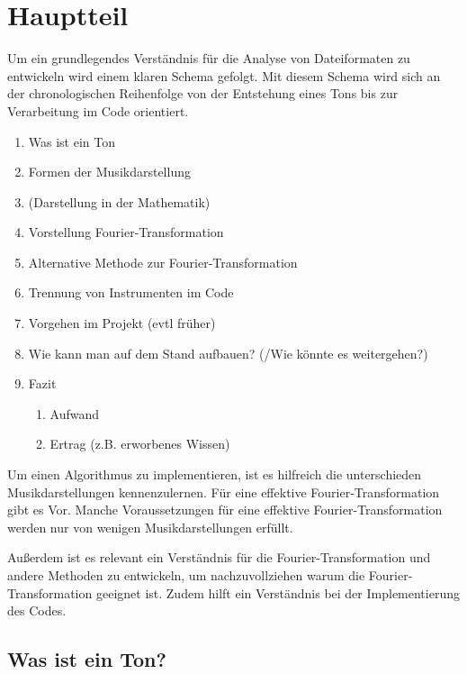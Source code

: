 \chapter{Hauptteil}
%


Um ein grundlegendes Verständnis für die Analyse von Dateiformaten zu entwickeln wird einem klaren Schema gefolgt. Mit diesem Schema wird sich an der chronologischen Reihenfolge von der Entstehung eines Tons bis zur Verarbeitung im Code orientiert.

%
\begin{enumerate}
    \item Was ist ein Ton
    \item Formen der Musikdarstellung
    \item (Darstellung in der Mathematik)
    \item Vorstellung Fourier-Transformation
    \item Alternative Methode zur Fourier-Transformation
    \item Trennung von Instrumenten im Code
    \item Vorgehen im Projekt (evtl früher)
    \item Wie kann man auf dem Stand aufbauen? (/Wie könnte es weitergehen?)
    \item Fazit
    \begin{enumerate}
        \item Aufwand
        \item Ertrag (z.B. erworbenes Wissen)
    \end{enumerate}
\end{enumerate}
%

Um einen Algorithmus zu implementieren, ist es hilfreich die unterschieden Musikdarstellungen kennenzulernen. Für eine effektive Fourier-Transformation gibt es Vor. Manche Voraussetzungen für eine effektive Fourier-Transformation werden nur von wenigen Musikdarstellungen erfüllt.

\par

Außerdem ist es relevant ein Verständnis für die Fourier-Transformation und andere Methoden zu entwickeln, um nachzuvollziehen warum die Fourier-Transformation geeignet ist. Zudem hilft ein Verständnis bei der Implementierung des Codes.

%
\section{Was ist ein Ton?}
\label{sounds}
%

